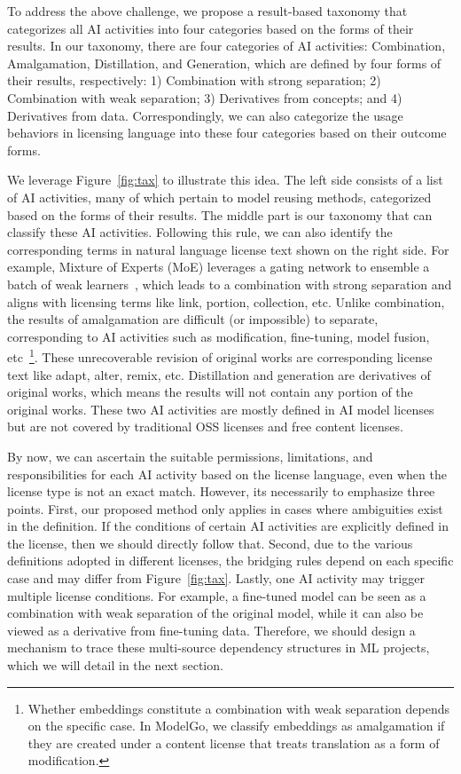 To address the above challenge, we propose a result-based taxonomy that categorizes all AI activities into four categories based on the forms of their results. 
In our taxonomy, there are four categories of AI activities: Combination, Amalgamation, Distillation, and Generation, which are defined by four forms of their results, respectively: 1) Combination with strong separation; 2) Combination with weak separation; 3) Derivatives from concepts; and 4) Derivatives from data.
Correspondingly, we can also categorize the usage behaviors in licensing language into these four categories based on their outcome forms.

We leverage Figure~\ref{fig:tax} to illustrate this idea.
The left side consists of a list of AI activities, many of which pertain to model reusing methods, categorized based on the forms of their results.
The middle part is our taxonomy that can classify these AI activities.
Following this rule, we can also identify the corresponding terms in natural language license text shown on the right side.
For example, Mixture of Experts (MoE) leverages a gating network to ensemble a batch of weak learners~\cite{jacobs1991adaptive}, which leads to a combination with strong separation and aligns with licensing terms like link, portion, collection, etc.
Unlike combination, the results of amalgamation are difficult (or impossible) to separate, corresponding to AI activities such as modification, fine-tuning, model fusion, etc~\footnote{Whether embeddings constitute a combination with weak separation depends on the specific case. In ModelGo, we classify embeddings as amalgamation if they are created under a content license that treats translation as a form of modification.}. 
These unrecoverable revision of original works are corresponding license text like adapt, alter, remix, etc.
Distillation and generation are derivatives of original works, which means the results will not contain any portion of the original works. 
These two AI activities are mostly defined in AI model licenses but are not covered by traditional OSS licenses and free content licenses.

By now, we can ascertain the suitable permissions, limitations, and responsibilities for each AI activity based on the license language, even when the license type is not an exact match.
However, its necessarily to emphasize three points.
First, our proposed method only applies in cases where ambiguities exist in the definition. 
If the conditions of certain AI activities are explicitly defined in the license, then we should directly follow that.
Second, due to the various definitions adopted in different licenses, the bridging rules depend on each specific case and may differ from Figure~\ref{fig:tax}.
Lastly, one AI activity may trigger multiple license conditions. For example, a fine-tuned model can be seen as a combination with weak separation of the original model, while it can also be viewed as a derivative from fine-tuning data.
Therefore, we should design a mechanism to trace these multi-source dependency structures in ML projects, which we will detail in the next section.
 
